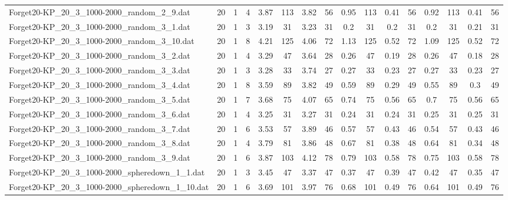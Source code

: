 \begin{sidewaystable}[!ht]
{\begin{tabular}{lccccccccccccccc}
Forget20-KP\_20\_3\_1000-2000\_random\_2\_9.dat & 20 & 1 & 4 & 3.87 & 113 & 3.82 & 56 & 0.95 & 113 &  \textcolor{blue2}{0.41} & 56 & 0.92 & 113 &  \textcolor{blue2}{0.41} & 56 \\
Forget20-KP\_20\_3\_1000-2000\_random\_3\_1.dat & 20 & 1 & 3 & 3.19 & 31 & 3.23 & 31 & 0.2 & 31 & 0.2 & 31 & 0.2 & 31 & 0.21 & 31 \\
Forget20-KP\_20\_3\_1000-2000\_random\_3\_10.dat & 20 & 1 & 8 & 4.21 & 125 & 4.06 & 72 & 1.13 & 125 &  \textcolor{blue2}{0.52} & 72 & 1.09 & 125 &  \textcolor{blue2}{0.52} & 72 \\
Forget20-KP\_20\_3\_1000-2000\_random\_3\_2.dat & 20 & 1 & 4 & 3.29 & 47 & 3.64 & 28 & 0.26 & 47 & 0.19 & 28 & 0.26 & 47 &  \textcolor{blue2}{0.18} & 28 \\
Forget20-KP\_20\_3\_1000-2000\_random\_3\_3.dat & 20 & 1 & 3 & 3.28 & 33 & 3.74 & 27 & 0.27 & 33 &  \textcolor{blue2}{0.23} & 27 & 0.27 & 33 &  \textcolor{blue2}{0.23} & 27 \\
Forget20-KP\_20\_3\_1000-2000\_random\_3\_4.dat & 20 & 1 & 8 & 3.59 & 89 & 3.82 & 49 & 0.59 & 89 &  \textcolor{blue2}{0.29} & 49 & 0.55 & 89 & 0.3 & 49 \\
Forget20-KP\_20\_3\_1000-2000\_random\_3\_5.dat & 20 & 1 & 7 & 3.68 & 75 & 4.07 & 65 & 0.74 & 75 &  \textcolor{blue2}{0.56} & 65 & 0.7 & 75 &  \textcolor{blue2}{0.56} & 65 \\
Forget20-KP\_20\_3\_1000-2000\_random\_3\_6.dat & 20 & 1 & 4 & 3.25 & 31 & 3.27 & 31 &  \textcolor{blue2}{0.24} & 31 &  \textcolor{blue2}{0.24} & 31 & 0.25 & 31 & 0.25 & 31 \\
Forget20-KP\_20\_3\_1000-2000\_random\_3\_7.dat & 20 & 1 & 6 & 3.53 & 57 & 3.89 & 46 & 0.57 & 57 & 0.43 & 46 & 0.54 & 57 & 0.43 & 46 \\
Forget20-KP\_20\_3\_1000-2000\_random\_3\_8.dat & 20 & 1 & 4 & 3.79 & 81 & 3.86 & 48 & 0.67 & 81 & 0.38 & 48 & 0.64 & 81 &  \textcolor{blue2}{0.34} & 48 \\
Forget20-KP\_20\_3\_1000-2000\_random\_3\_9.dat & 20 & 1 & 6 & 3.87 & 103 & 4.12 & 78 & 0.79 & 103 &  \textcolor{blue2}{0.58} & 78 & 0.75 & 103 &  \textcolor{blue2}{0.58} & 78 \\
Forget20-KP\_20\_3\_1000-2000\_spheredown\_1\_1.dat & 20 & 1 & 3 & 3.45 & 47 & 3.37 & 47 & 0.37 & 47 & 0.39 & 47 & 0.42 & 47 &  \textcolor{blue2}{0.35} & 47 \\
Forget20-KP\_20\_3\_1000-2000\_spheredown\_1\_10.dat & 20 & 1 & 6 & 3.69 & 101 & 3.97 & 76 & 0.68 & 101 &  \textcolor{blue2}{0.49} & 76 & 0.64 & 101 &  \textcolor{blue2}{0.49} & 76 \\

\end{tabular}}
\end{sidewaystable}
